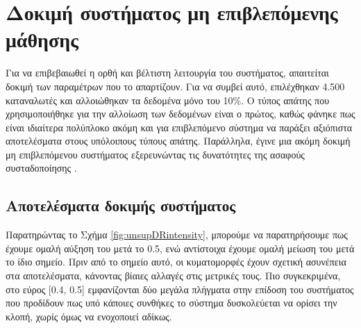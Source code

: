 \section{Δοκιμή συστήματος μη επιβλεπόμενης μάθησης}
Για να επιβεβαιωθεί η ορθή και βέλτιστη λειτουργία του συστήματος, απαιτείται δοκιμή των παραμέτρων που το απαρτίζουν. Για να συμβεί αυτό, επιλέχθηκαν 4.500 καταναλωτές και αλλοιώθηκαν τα δεδομένα μόνο του 10\%. Ο τύπος απάτης που χρησιμοποιήθηκε για την αλλοίωση των δεδομένων είναι ο πρώτος, καθώς φάνηκε πως είναι ιδιαίτερα πολύπλοκο ακόμη και για επιβλεπόμενο σύστημα να παράξει αξιόπιστα αποτελέσματα στους υπόλοιπους τύπους απάτης. Παράλληλα, έγινε μια ακόμη δοκιμή μη επιβλεπόμενου συστήματος εξερευνώντας τις δυνατότητες της ασαφούς συσταδοποίησης .\par

\subsection{Αποτελέσματα δοκιμής συστήματος}
Παρατηρώντας το Σχήμα \ref{fig:unsupDRintensity}, μπορούμε να παρατηρήσουμε πως έχουμε ομαλή αύξηση του  μετά το 0.5, ενώ αντίστοιχα έχουμε ομαλή μείωση του  μετά το ίδιο σημείο. Πριν από το σημείο αυτό, οι κυματομορφές έχουν σχετική ασυνέπεια στα αποτελέσματα, κάνοντας βίαιες αλλαγές στις μετρικές τους. Πιο συγκεκριμένα, στο εύρος [0.4, 0.5] εμφανίζονται δύο μεγάλα πλήγματα στην επίδοση του συστήματος που προδίδουν πως υπό κάποιες συνθήκες το σύστημα δυσκολεύεται να ορίσει την κλοπή, χωρίς όμως να ενοχοποιεί αδίκως.\par

